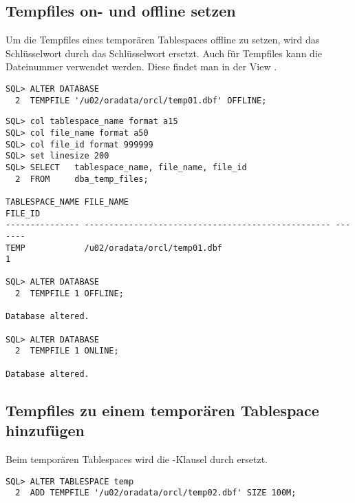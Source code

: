       \subsection{Tempfiles on- und offline setzen}
        Um die Tempfiles eines temporären Tablespaces offline zu setzen, wird das Schlüsselwort  durch das Schlüsselwort  ersetzt. Auch für Tempfiles kann die Dateinummer verwendet werden. Diese findet man in der View .

        \begin{lstlisting}[caption={Ein Tempfile mit Hilfe des Dateinamens offline setzen},label=admin132,language=oracle_sql]
SQL> ALTER DATABASE
  2  TEMPFILE '/u02/oradata/orcl/temp01.dbf' OFFLINE;
        \end{lstlisting}
        \begin{lstlisting}[caption={Offline-/Onlinesetzen eines Tempfiles mittels der Dateinummer},label=admin133,language=oracle_sql,alsolanguage=sqlplus]
SQL> col tablespace_name format a15
SQL> col file_name format a50
SQL> col file_id format 999999
SQL> set linesize 200
SQL> SELECT   tablespace_name, file_name, file_id
  2  FROM     dba_temp_files;

TABLESPACE_NAME FILE_NAME                                          FILE_ID
--------------- -------------------------------------------------- -------
TEMP            /u02/oradata/orcl/temp01.dbf                             1

SQL> ALTER DATABASE
  2  TEMPFILE 1 OFFLINE;

Database altered.

SQL> ALTER DATABASE
  2  TEMPFILE 1 ONLINE;

Database altered.
        \end{lstlisting}
      \subsection{Tempfiles zu einem temporären Tablespace hinzufügen}
        Beim temporären Tablespaces wird die -Klausel durch  ersetzt.
        \begin{lstlisting}[caption={Hinzufügen eines Tempfiles},label=admin134,language=oracle_sql]
SQL> ALTER TABLESPACE temp
  2  ADD TEMPFILE '/u02/oradata/orcl/temp02.dbf' SIZE 100M;
        \end{lstlisting}
